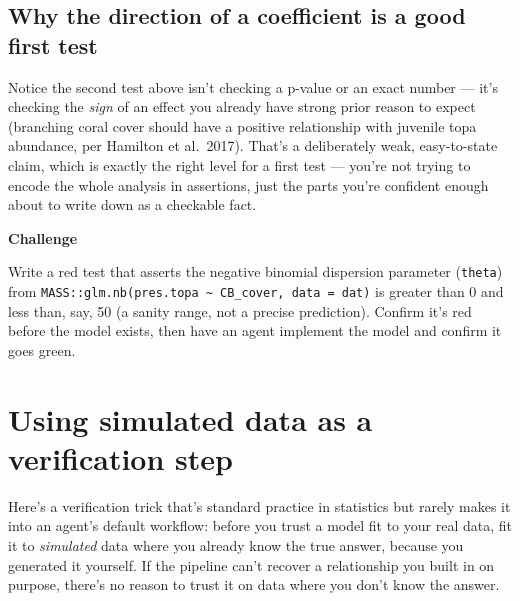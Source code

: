 \documentclass[
  letterpaper,
  DIV=11,
  numbers=noendperiod]{scrreprt}
\begin{document}
\section{Why the direction of a coefficient is a good first
test}\label{why-the-direction-of-a-coefficient-is-a-good-first-test}

Notice the second test above isn't checking a p-value or an exact number
--- it's checking the \emph{sign} of an effect you already have strong
prior reason to expect (branching coral cover should have a positive
relationship with juvenile topa abundance, per Hamilton et al.~2017).
That's a deliberately weak, easy-to-state claim, which is exactly the
right level for a first test --- you're not trying to encode the whole
analysis in assertions, just the parts you're confident enough about to
write down as a checkable fact.

\begin{tcolorbox}[enhanced jigsaw, toprule=.15mm, rightrule=.15mm, left=2mm, leftrule=.75mm, breakable, opacityback=0, arc=.35mm, colframe=quarto-callout-important-color-frame, bottomrule=.15mm, colback=white]
\begin{minipage}[t]{5.5mm}
\textcolor{quarto-callout-important-color}{\faExclamation}
\end{minipage}%
\begin{minipage}[t]{\textwidth - 5.5mm}

\vspace{-3mm}\textbf{Challenge}\vspace{3mm}

Write a red test that asserts the negative binomial dispersion parameter
(\texttt{theta}) from
\texttt{MASS::glm.nb(pres.topa\ \textasciitilde{}\ CB\_cover,\ data\ =\ dat)}
is greater than 0 and less than, say, 50 (a sanity range, not a precise
prediction). Confirm it's red before the model exists, then have an
agent implement the model and confirm it goes green.

\end{minipage}%
\end{tcolorbox}

\chapter{Using simulated data as a verification
step}\label{using-simulated-data-as-a-verification-step}

Here's a verification trick that's standard practice in statistics but
rarely makes it into an agent's default workflow: before you trust a
model fit to your real data, fit it to \emph{simulated} data where you
already know the true answer, because you generated it yourself. If the
pipeline can't recover a relationship you built in on purpose, there's
no reason to trust it on data where you don't know the answer.
\end{document}
